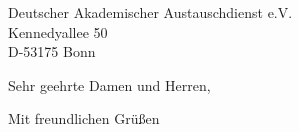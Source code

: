 \documentclass[
fontsize=12pt,
paper=a4,
enlargefirstpage=off,
firsthead=true,
fromalign=right,
fromrule=below,
firstfood=false,
pagenumber=false, %
parskip=half, %
foldmarks=false, %
addrfield=true, %
backaddress=false
]{scrlttr2}
\date{\today} %
\begin{document}

\begin{letter}{Deutscher Akademischer Austauschdienst e.V. \\
    Kennedyallee 50 \\ D-53175 Bonn} %


\opening{Sehr geehrte Damen und Herren,}

\lipsum[1]{}

\lipsum[1]{}

\closing{Mit freundlichen Grüßen}



\end{letter}
 
\end{document}
